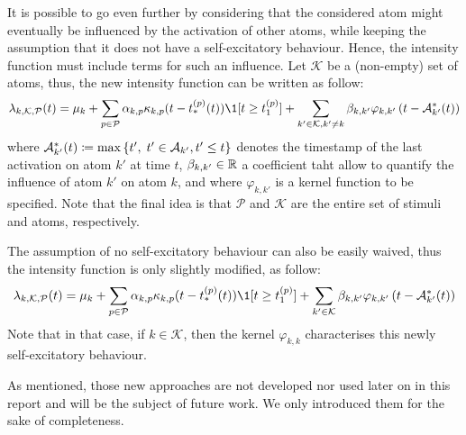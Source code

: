 It is possible to go even further by considering that the considered atom might eventually be influenced by the activation of other atoms, while keeping the assumption that it does not have a self-excitatory behaviour.
Hence, the intensity function must include terms for such an influence.
Let $\mathcal{K}$ be a (non-empty) set of atoms, thus, the new intensity function can be written as follow:
\begin{equation}
    \lambda_{k,\mathcal{K},\mathcal{P}}(t)  = \mu_k + \sum_{p\in\mathcal{P}} \alpha_{k,p}\kappa_{k,p}(t - t_*^{(p)}(t))\1[t \geq t_1^{(p)}] + \sum_{k'\in\mathcal{K}, k' \ne k} \beta_{k,k'} \varphi_{k,k'}\pars{t - \mathcal{A}_{k'}^*(t)}
\end{equation}
where $\mathcal{A}_{k'}^*(t) \coloneqq \max\left\lbrace t',\; t' \in \mathcal{A}_{k'}, t' \leq t \right\rbrace$ denotes the timestamp of the last activation on atom $k'$ at time $t$, $\beta_{k,k'}\in\mathbb{R}$ a coefficient taht allow to quantify the influence of atom $k'$ on atom $k$, and where $\varphi_{k,k'}$ is a kernel function to be specified.
Note that the final idea is that $\mathcal{P}$ and $\mathcal{K}$ are the entire set of stimuli and atoms, respectively.

The assumption of no self-excitatory behaviour can also be easily waived, thus the intensity function is only slightly modified, as follow:
\begin{equation}
    \lambda_{k,\mathcal{K},\mathcal{P}}(t)  = \mu_k + \sum_{p\in\mathcal{P}} \alpha_{k,p}\kappa_{k,p}(t - t_*^{(p)}(t))\1[t \geq t_1^{(p)}] + \sum_{k'\in\mathcal{K}} \beta_{k,k'} \varphi_{k,k'}\pars{t - \mathcal{A}_{k'}^*(t)}
\end{equation}
Note that in that case, if $k\in\mathcal{K}$, then the kernel $\varphi_{k,k}$ characterises this newly self-excitatory behaviour.

As mentioned, those new approaches are not developed nor used later on in this report and will be the subject of future work.
We only introduced them for the sake of completeness.